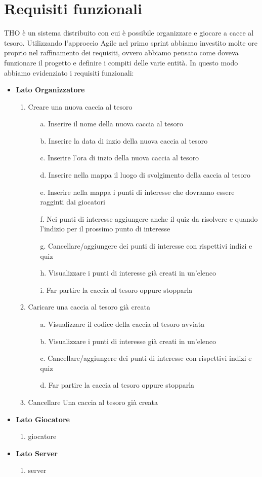 \documentclass[12pt, english]{report}
\begin{document}
\section{Requisiti funzionali}
THO è un sistema distribuito con cui è possibile organizzare e giocare a cacce al tesoro. Utilizzando l'approccio Agile nel primo sprint abbiamo investito molte ore proprio nel raffinamento dei requisiti, ovvero abbiamo pensato come doveva funzionare il progetto e definire i compiti delle varie entità. In questo modo abbiamo evidenziato i requisiti funzionali:
\begin{itemize}
	\item \textbf{Lato Organizzatore} 
	\begin{enumerate}
		\item Creare una nuova caccia al tesoro
			\begin{enumerate}
				\item [a.] Inserire il nome della nuova caccia al tesoro
				\item [b.] Inserire la data di inzio della nuova caccia al tesoro
				\item [c.] Inserire l'ora di inzio della nuova caccia al tesoro
				\item [d.] Inserire nella mappa il luogo di svolgimento della caccia al tesoro
				\item [e.] Inserire nella mappa i punti di interesse che dovranno essere ragginti dai giocatori
				\item [f.] Nei punti di interesse aggiungere anche il quiz da risolvere e quando l'indizio per il prossimo punto di interesse
				\item [g.] Cancellare/aggiungere dei punti di interesse con rispettivi indizi e quiz
				\item [h.] Visualizzare i punti di interesse già creati in un'elenco
				\item [i.] Far partire la caccia al tesoro oppure stopparla
			\end{enumerate}
		\item Caricare una caccia al tesoro già creata
		\begin{enumerate}
			\item [a.] Visualizzare il codice della caccia al tesoro avviata
			\item [b.] Visualizzare i punti di interesse già creati in un'elenco
			\item [c.] Cancellare/aggiungere dei punti di interesse con rispettivi indizi e quiz
			\item [d.] Far partire la caccia al tesoro oppure stopparla
		\end{enumerate}
		\item Cancellare Una caccia al tesoro già creata
	\end{enumerate}
	\item \textbf{Lato Giocatore}
		\begin{enumerate}
			\item giocatore
		\end{enumerate} 
	\item \textbf{Lato Server}
		\begin{enumerate}
			\item server
		\end{enumerate}
\end{itemize}
\end{document}
